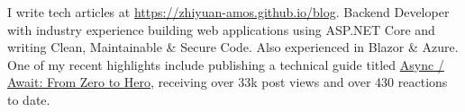 

\begin{cvparagraph}

I write tech articles at \href{https://zhiyuan-amos.github.io/blog}{https://zhiyuan-amos.github.io/blog}. Backend Developer with industry experience building web applications using ASP.NET Core and writing Clean, Maintainable \& Secure Code. Also experienced in Blazor \& Azure.
\newline
\newline
One of my recent highlights include publishing a technical guide titled \href{https://dev.to/zhiyuanamos/async-await-from-zero-to-hero-a22}{Async / Await: From Zero to Hero}, receiving over 33k post views and over 430 reactions to date.
\end{cvparagraph}